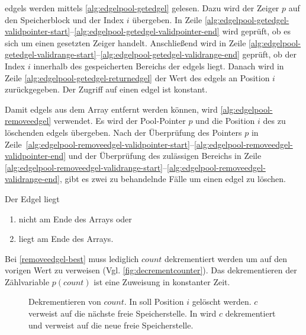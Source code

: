 

\glspl{edgel} werden mittels \autoref{alg:edgelpool-getedgel} gelesen. Dazu wird der Zeiger $p$ auf den Speicherblock
 und der Index $i$ übergeben. In Zeile
 \ref{alg:edgelpool-getedgel-validpointer-start}--\ref{alg:edgelpool-getedgel-validpointer-end} wird geprüft, ob es
 sich um einen gesetzten Zeiger handelt. Anschließend wird in Zeile
 \ref{alg:edgelpool-getedgel-validrange-start}--\ref{alg:edgelpool-getedgel-validrange-end} geprüft, ob der Index $i$
 innerhalb des gespeicherten Bereichs der \glspl{edgel} liegt. Danach wird in Zeile
 \ref{alg:edgelpool-getedgel-returnedgel} der Wert des \glspl{edgel} an Position $i$ zurückgegeben. Der Zugriff auf
 einen \gls{edgel} ist konstant.



Damit \glspl{edgel} aus dem Array entfernt werden können, wird \autoref{alg:edgelpool-removeedgel} verwendet. Es wird
 der Pool-Pointer $p$ und die Position $i$ des zu löschenden \glspl{edgel} übergeben. Nach der Überprüfung des Pointers
 $p$ in Zeile~\ref{alg:edgelpool-removeedgel-validpointer-start}--\ref{alg:edgelpool-removeedgel-validpointer-end} und
 der Überprüfung des zulässigen Bereichs in Zeile
 \ref{alg:edgelpool-removeedgel-validrange-start}--\ref{alg:edgelpool-removeedgel-validrange-end}, gibt es zwei zu
 behandelnde Fälle um einen \gls{edgel} zu löschen.



Der Edgel liegt
\begin{enumerate}
	\item nicht am Ende des Arrays oder \label{removeedgel-worst}
	\item liegt am Ende des Arrays. \label{removeedgel-best}
\end{enumerate}

Bei \autoref{removeedgel-best} muss lediglich $\mathit{count}$ dekrementiert werden um auf den vorigen Wert zu verweisen
 (Vgl. \autoref{fig:decrementcounter}). Das dekrementieren der Zählvariable $p(\mathit{count})$ ist eine Zuweisung in
 konstanter Zeit.

\begin{figure}[!ht]
	\centering
	\subfigure[]{
		
		\label{fig:decrementcounter-before}
	}
	\subfigure[]{
		
		\label{fig:decrementcounter-after}
	}
	\caption{Dekrementieren von $\mathit{count}$. In  soll Position $i$ gelöscht
	 werden. $c$ verweist auf die nächste freie Speicherstelle. In  wird $c$
	 dekrementiert und verweist auf die neue freie Speicherstelle.}
	\label{fig:decrementcounter}
\end{figure}

